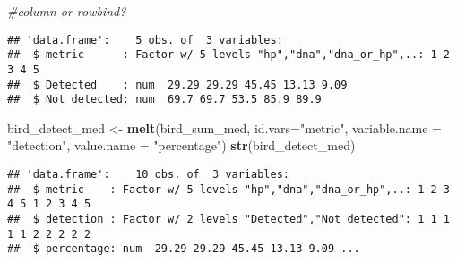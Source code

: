 \documentclass[]{article}
\newenvironment{Shaded}{\begin{snugshade}}{\end{snugshade}}
\newcommand{\KeywordTok}[1]{\textcolor[rgb]{0.13,0.29,0.53}{\textbf{#1}}}
\newcommand{\DataTypeTok}[1]{\textcolor[rgb]{0.13,0.29,0.53}{#1}}
\newcommand{\DecValTok}[1]{\textcolor[rgb]{0.00,0.00,0.81}{#1}}
\newcommand{\StringTok}[1]{\textcolor[rgb]{0.31,0.60,0.02}{#1}}
\newcommand{\CommentTok}[1]{\textcolor[rgb]{0.56,0.35,0.01}{\textit{#1}}}
\newcommand{\OtherTok}[1]{\textcolor[rgb]{0.56,0.35,0.01}{#1}}
\newcommand{\OperatorTok}[1]{\textcolor[rgb]{0.81,0.36,0.00}{\textbf{#1}}}
\newcommand{\NormalTok}[1]{#1}
\begin{document}
\begin{Shaded}
\begin{Highlighting}[]
\CommentTok{#column or rowbind?}
\end{Highlighting}
\end{Shaded}

\begin{Shaded}
\end{Shaded}

\begin{verbatim}
## 'data.frame':    5 obs. of  3 variables:
##  $ metric      : Factor w/ 5 levels "hp","dna","dna_or_hp",..: 1 2 3 4 5
##  $ Detected    : num  29.29 29.29 45.45 13.13 9.09
##  $ Not detected: num  69.7 69.7 53.5 85.9 89.9
\end{verbatim}

\begin{Shaded}
\begin{Highlighting}[]
\NormalTok{bird_detect_med <-}\StringTok{ }\KeywordTok{melt}\NormalTok{(bird_sum_med, }\DataTypeTok{id.vars=}\StringTok{"metric"}\NormalTok{, }\DataTypeTok{variable.name =} \StringTok{"detection"}\NormalTok{, }\DataTypeTok{value.name =} \StringTok{"percentage"}\NormalTok{)}
\KeywordTok{str}\NormalTok{(bird_detect_med)}
\end{Highlighting}
\end{Shaded}

\begin{verbatim}
## 'data.frame':    10 obs. of  3 variables:
##  $ metric    : Factor w/ 5 levels "hp","dna","dna_or_hp",..: 1 2 3 4 5 1 2 3 4 5
##  $ detection : Factor w/ 2 levels "Detected","Not detected": 1 1 1 1 1 2 2 2 2 2
##  $ percentage: num  29.29 29.29 45.45 13.13 9.09 ...
\end{verbatim}
\end{document}
